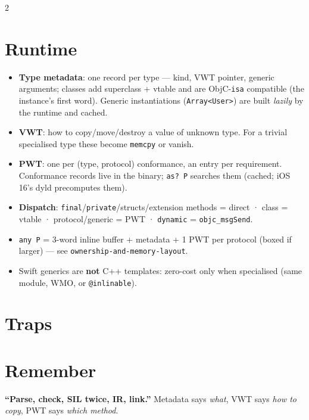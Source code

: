 \documentclass[8pt]{extarticle}
\begin{document}
\begin{multicols}{2}
\section{Runtime}
\begin{itemize}
  \item \textbf{Type metadata}: one record per type — kind, VWT pointer,
        generic arguments; classes add superclass + vtable and are
        ObjC-\texttt{isa} compatible (the instance's first word). Generic
        instantiations (\texttt{Array<User>}) are built \emph{lazily} by the
        runtime and cached.
  \item \textbf{VWT}: how to copy/move/destroy a value of unknown type. For a
        trivial specialised type these become \texttt{memcpy} or vanish.
  \item \textbf{PWT}: one per (type, protocol) conformance, an entry per
        requirement. Conformance records live in the binary; \texttt{as? P}
        searches them (cached; iOS 16's dyld precomputes them).
  \item \textbf{Dispatch}: \texttt{final}/\texttt{private}/structs/extension
        methods = direct · class = vtable · protocol/generic = PWT ·
        \texttt{dynamic} = \texttt{objc\_msgSend}.
  \item \texttt{any P} = 3-word inline buffer + metadata + 1 PWT per protocol
        (boxed if larger) — see \texttt{ownership-and-memory-layout}.
  \item Swift generics are \textbf{not} C++ templates: zero-cost only when
        specialised (same module, WMO, or \texttt{@inlinable}).
\end{itemize}

\section{Traps}
\begin{itemize}
\end{itemize}

\section{Remember}
\textbf{``Parse, check, SIL twice, IR, link.''} Metadata says \emph{what},
VWT says \emph{how to copy}, PWT says \emph{which method}.


\end{multicols}

\end{document}
